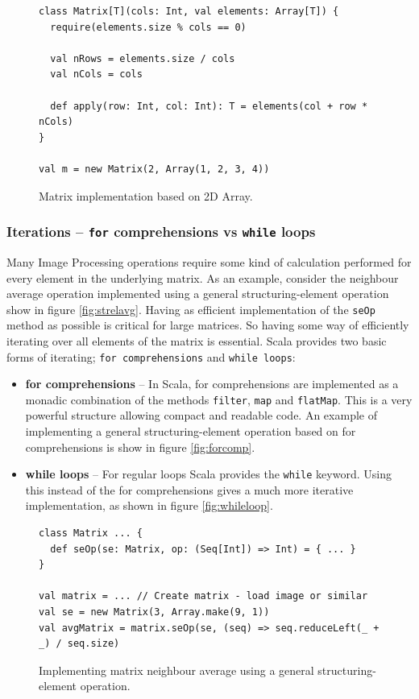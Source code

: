 \documentclass[a4paper,english]{report}
\begin{document}
\begin{figure}
  \begin{lstlisting}
class Matrix[T](cols: Int, val elements: Array[T]) {
  require(elements.size % cols == 0)

  val nRows = elements.size / cols
  val nCols = cols

  def apply(row: Int, col: Int): T = elements(col + row * nCols)
}

val m = new Matrix(2, Array(1, 2, 3, 4))
  \end{lstlisting}
  \caption{Matrix implementation based on 2D
    Array.\label{fig:2darray}}
\end{figure}

\subsubsection{Iterations -- \texttt{for} comprehensions vs \texttt{while} loops}

Many Image Processing operations require some kind of calculation
performed for every element in the underlying matrix. As an example,
consider the neighbour average operation implemented using a general
structuring-element operation show in figure
\vref{fig:strelavg}. Having as efficient implementation of the
\texttt{seOp} method as possible is critical for large matrices. So
having some way of efficiently iterating over all elements of the
matrix is essential. Scala provides two basic forms of iterating;
\texttt{for comprehensions} and \texttt{while loops}:

\begin{itemize}
\item \textbf{for comprehensions} -- In Scala, for comprehensions are
  implemented as a monadic combination of the methods \texttt{filter},
  \texttt{map} and \texttt{flatMap}. This is a very powerful structure
  allowing compact and readable code. An example of implementing a
  general structuring-element operation based on for comprehensions is
  show in figure \vref{fig:forcomp}.
\item \textbf{while loops} -- For regular loops Scala provides the
  \texttt{while} keyword. Using this instead of the for comprehensions
  gives a much more iterative implementation, as shown in figure
  \vref{fig:whileloop}.
\end{itemize}

\begin{figure}
  \begin{lstlisting}
class Matrix ... {
  def seOp(se: Matrix, op: (Seq[Int]) => Int) = { ... }
}

val matrix = ... // Create matrix - load image or similar
val se = new Matrix(3, Array.make(9, 1))
val avgMatrix = matrix.seOp(se, (seq) => seq.reduceLeft(_ + _) / seq.size)
  \end{lstlisting}
  \caption{Implementing matrix neighbour average using a general
    structuring-element operation.\label{fig:strelavg}}
\end{figure}
\end{document}
